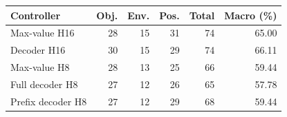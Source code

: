 \begin{tabular}{lrrrrr}
\toprule
Controller & Obj. & Env. & Pos. & Total & Macro (\%) \\
\midrule
Max-value H16 & 28 & 15 & 31 & 74 & 65.00 \\
Decoder H16 & 30 & 15 & 29 & 74 & 66.11 \\
Max-value H8 & 28 & 13 & 25 & 66 & 59.44 \\
Full decoder H8 & 27 & 12 & 26 & 65 & 57.78 \\
Prefix decoder H8 & 27 & 12 & 29 & 68 & 59.44 \\
\bottomrule
\end{tabular}

